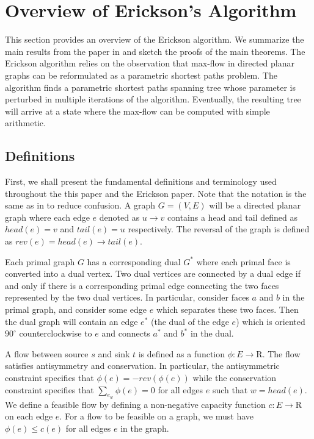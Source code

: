 \documentclass[12pt]{article}
\begin{document}
\section{Overview of Erickson's Algorithm}

This section provides an overview of the Erickson algorithm. We summarize the main results from the paper in \cite{erickson2010} and sketch the proofs of the main theorems. The Erickson algorithm relies on the observation that max-flow in directed planar graphs can be reformulated as a parametric shortest paths problem. The algorithm finds a parametric shortest paths spanning tree whose parameter is perturbed in multiple iterations of the algorithm. Eventually, the resulting tree will arrive at a state where the max-flow can be computed with simple arithmetic. 

\subsection{Definitions}

First, we shall present the fundamental definitions and terminology used throughout the this paper and the Erickson \cite{erickson2010} paper. Note that the notation is the same as in \cite{erickson2010} to reduce confusion. A graph $G = (V,E)$ will be a directed planar graph where each edge $e$ denoted as $u \to v$ contains a head and tail defined as $head(e) = v$ and $tail(e) = u$ respectively. The reversal of the graph is defined as $rev(e) = head(e) \to tail(e)$. 

Each primal graph $G$ has a corresponding dual $G^*$ where each primal face is converted into a dual vertex. Two dual vertices are connected by a dual edge if and only if there is a corresponding primal edge connecting the two faces represented by the two dual vertices. In particular, consider faces $a$ and $b$ in the primal graph, and consider some edge $e$ which separates these two faces. Then the dual graph will contain an edge $e^*$ (the dual of the edge $e$) which is oriented $90^\circ$ counterclockwise to $e$ and connects $a^*$ and $b^*$ in the dual. 

A flow between source $s$ and sink $t$ is defined as a function $\phi : E \to \mathrm{R}$. The flow satisfies antisymmetry and conservation. In particular, the antisymmetric constraint specifies that $\phi(e) = -rev(\phi(e))$ while the conservation constraint specifies that $\sum_{e_w} \phi(e) = 0$ for all edges $e$ such that $w = head(e)$. We define a feasible flow by defining a non-negative capacity function $c : E \to \mathrm{R}$ on each edge $e$. For a flow to be feasible on a graph, we must have $\phi(e) \leq c(e)$ for all edges $e$ in the graph. 
\end{document}
